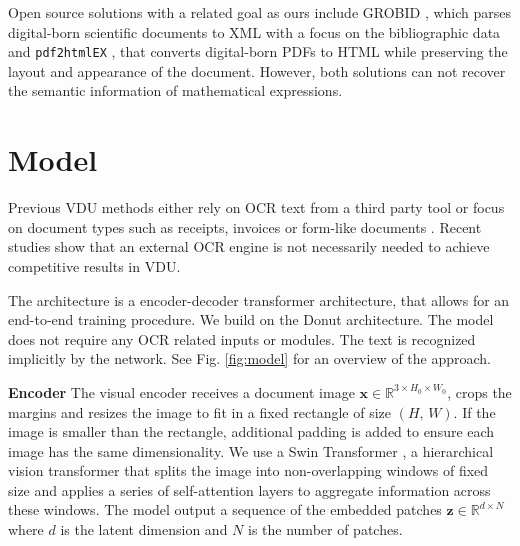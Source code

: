 \documentclass[]{article}
\newcommand{\para}[1]{\textbf{#1} \quad}
\begin{document}
Open source solutions with a related goal as ours include GROBID \cite{lopez_grobid_2023}, which parses digital-born scientific documents to XML with a focus on the bibliographic data and \verb|pdf2htmlEX| \cite{lu_wang_online_2013}, that converts digital-born PDFs to HTML while preserving the layout and appearance of the document. However, both solutions can not recover the semantic information of mathematical expressions.

\section{Model}
Previous VDU methods either rely on OCR text from a third party tool \cite{xu_layoutlm_2020, xu_layoutlmv2_2022, appalaraju_docformer_2021} or focus on document types such as receipts, invoices or form-like documents \cite{majumder_representation_2020}.
Recent studies \cite{kim_ocr-free_2022, davis_end--end_2022} show that an external OCR engine is not necessarily needed to achieve competitive results in VDU.

The architecture is a encoder-decoder transformer \cite{vaswani_attention_2017} architecture, that allows for an end-to-end training procedure. We build on the Donut \cite{kim_ocr-free_2022} architecture. The model does not require any OCR related inputs or modules. The text is recognized implicitly by the network. See Fig. \ref{fig:model} for an overview of the approach.

\para{Encoder} The visual encoder receives a document image $\mathbf x\in \mathbb R^{3\times H_0\times W_0}$, crops the margins and resizes the image to fit in a fixed rectangle of size $(H,\,W)$. If the image is smaller than the rectangle, additional padding is added to ensure each image has the same dimensionality. We use a Swin Transformer \cite{liu_swin_2021}, a hierarchical vision transformer  \cite{dosovitskiy_image_2021} that splits the image into non-overlapping windows of fixed size and applies a series of self-attention layers to aggregate information across these windows. The model output a sequence of the embedded patches $\mathbf z\in \mathbb R^{d\times N}$ where $d$ is the latent dimension and $N$ is the number of patches.
\end{document}
